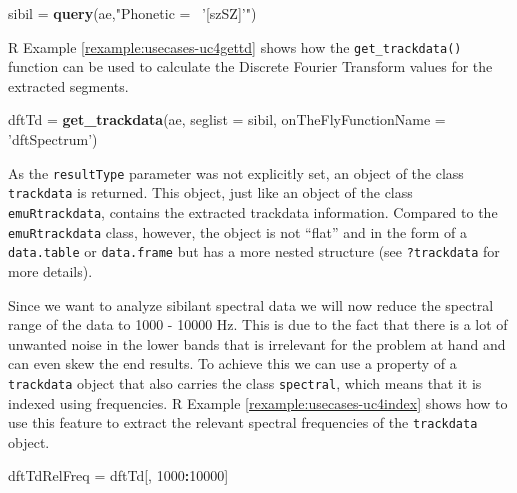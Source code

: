 \documentclass[]{book}
\newenvironment{Shaded}{\begin{snugshade}}{\end{snugshade}}
\newcommand{\DataTypeTok}[1]{\textcolor[rgb]{0.13,0.29,0.53}{#1}}
\newcommand{\DecValTok}[1]{\textcolor[rgb]{0.00,0.00,0.81}{#1}}
\newcommand{\KeywordTok}[1]{\textcolor[rgb]{0.13,0.29,0.53}{\textbf{#1}}}
\newcommand{\NormalTok}[1]{#1}
\newcommand{\OperatorTok}[1]{\textcolor[rgb]{0.81,0.36,0.00}{\textbf{#1}}}
\newcommand{\StringTok}[1]{\textcolor[rgb]{0.31,0.60,0.02}{#1}}
\theoremstyle{definition}
\theoremstyle{definition}
\theoremstyle{definition}
\theoremstyle{remark}
\begin{document}
\begin{Shaded}
\begin{Highlighting}[]
\NormalTok{sibil =}\StringTok{ }\KeywordTok{query}\NormalTok{(ae,}\StringTok{"Phonetic =~ '[szSZ]'"}\NormalTok{)}
\end{Highlighting}
\end{Shaded}

R Example \ref{rexample:usecases-uc4gettd} shows how the
\texttt{get\_trackdata()} function can be used to calculate the Discrete
Fourier Transform values for the extracted segments.

\begin{Shaded}
\begin{Highlighting}[]
\NormalTok{dftTd =}\StringTok{ }\KeywordTok{get_trackdata}\NormalTok{(ae,}
                      \DataTypeTok{seglist =}\NormalTok{ sibil,}
                      \DataTypeTok{onTheFlyFunctionName =} \StringTok{'dftSpectrum'}\NormalTok{)}
\end{Highlighting}
\end{Shaded}

As the \texttt{resultType} parameter was not explicitly set, an object
of the class \texttt{trackdata} is returned. This object, just like an
object of the class \texttt{emuRtrackdata}, contains the extracted
trackdata information. Compared to the \texttt{emuRtrackdata} class,
however, the object is not ``flat'' and in the form of a
\texttt{data.table} or \texttt{data.frame} but has a more nested
structure (see \texttt{?trackdata} for more details).

Since we want to analyze sibilant spectral data we will now reduce the
spectral range of the data to 1000 - 10000 Hz. This is due to the fact
that there is a lot of unwanted noise in the lower bands that is
irrelevant for the problem at hand and can even skew the end results. To
achieve this we can use a property of a \texttt{trackdata} object that
also carries the class \texttt{spectral}, which means that it is indexed
using frequencies. R Example \ref{rexample:usecases-uc4index} shows how
to use this feature to extract the relevant spectral frequencies of the
\texttt{trackdata} object.

\begin{Shaded}
\begin{Highlighting}[]
\NormalTok{dftTdRelFreq =}\StringTok{ }\NormalTok{dftTd[, }\DecValTok{1000}\OperatorTok{:}\DecValTok{10000}\NormalTok{]}
\end{Highlighting}
\end{Shaded}
\end{document}
